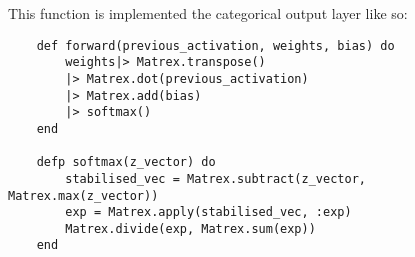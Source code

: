 This function is implemented the categorical output layer like so:
\begin{lstlisting}
    def forward(previous_activation, weights, bias) do
        weights|> Matrex.transpose()
        |> Matrex.dot(previous_activation)
        |> Matrex.add(bias)
        |> softmax()
    end

    defp softmax(z_vector) do
        stabilised_vec = Matrex.subtract(z_vector, Matrex.max(z_vector))
        exp = Matrex.apply(stabilised_vec, :exp)
        Matrex.divide(exp, Matrex.sum(exp))
    end
\end{lstlisting}










